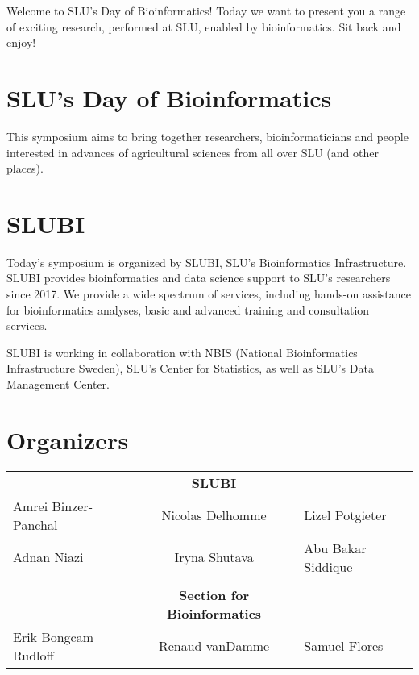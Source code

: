 {\small \textcolor{myblue}{Welcome to SLU's Day of Bioinformatics! Today we want to present you a range of exciting research, performed at SLU, enabled by bioinformatics. Sit back and enjoy!}}

\section{SLU's Day of Bioinformatics}
This symposium aims to bring together researchers, bioinformaticians and people interested in advances of agricultural sciences from all over SLU (and other places). 


\section{SLUBI}

Today's symposium is organized by SLUBI, SLU's Bioinformatics Infrastructure. SLUBI provides bioinformatics and data science support to SLU's researchers since 2017. We provide a wide spectrum of services, including hands-on assistance for bioinformatics analyses, basic and advanced training and consultation services. 

SLUBI is working in collaboration with NBIS (National Bioinformatics Infrastructure Sweden), SLU's Center for Statistics, as well as SLU's Data Management Center. 


\section{Organizers}
\begin{center}
\begin{tabular}{lcl}
 & \textbf{SLUBI} &  \\
 Amrei Binzer-Panchal & Nicolas Delhomme &  Lizel Potgieter \\
Adnan Niazi &  Iryna Shutava&  Abu Bakar Siddique\\
 &  &  \\
 & \textbf{Section for Bioinformatics} &  \\
Erik Bongcam Rudloff &  Renaud vanDamme &  Samuel Flores \\
\end{tabular}
\end{center}